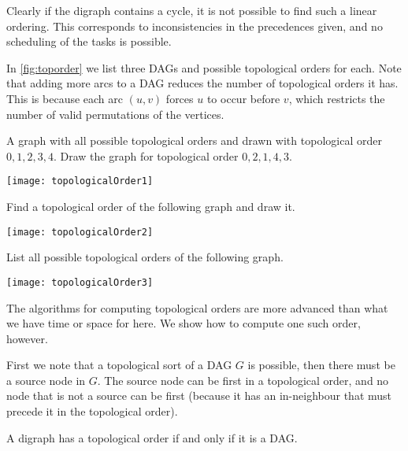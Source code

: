 Clearly if the digraph contains a cycle, it is not possible to find
such a linear ordering. This corresponds to inconsistencies in the
precedences given, and no scheduling of the tasks is possible.

\begin{Example}
\label{eg:toporder}
In \cref{fig:toporder} we list three DAGs and possible topological
orders for each. Note that adding more arcs to a DAG  reduces the number
of topological orders it has.  This is because each arc $(u,v)$ forces
$u$ to occur before $v$, which restricts the number of valid permutations
of the vertices.
\end{Example}

\begin{Boxample}[1]
A graph with all possible topological orders and drawn with topological order $0, 1, 2, 3, 4$.  Draw the graph for topological order $0, 2, 1, 4, 3$. 
\begin{center}
\texttt{[image: topologicalOrder1]}
\end{center}
Find a topological order of the following graph and draw it.
\begin{center}
\texttt{[image: topologicalOrder2]}
\end{center}
List all possible topological orders of the following graph.
\begin{center}
\texttt{[image: topologicalOrder3]}
\end{center}
\end{Boxample}

The algorithms for computing  topological orders are
more advanced than what we have time or space for here. We show how to
compute one such order, however.

First we note that  a topological sort of a DAG $G$
is possible, then there must be a source node in $G$. The source
node can be first in a topological order, and no node that is not
a source can be first (because it has an in-neighbour that must
precede it in the topological order). 


\begin{Theorem}
\label{thm:topDAG}
A digraph has a topological order if and only if it is a DAG.
\end{Theorem}

